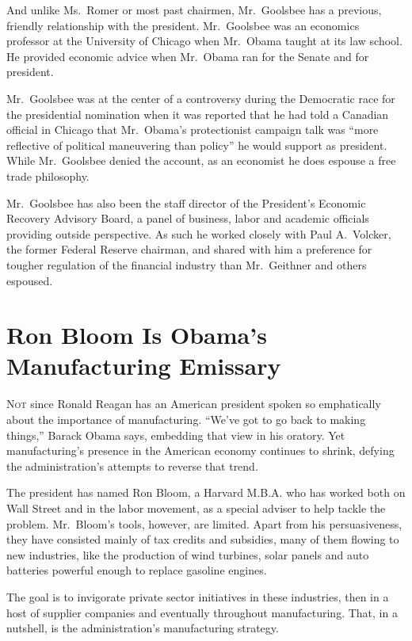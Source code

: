 ﻿\documentclass[12pt]{article}
\begin{document}
And unlike Ms.~Romer or most past chairmen, Mr.~Goolsbee has a previous, friendly relationship with
the president. Mr.~Goolsbee was an economics professor at the University of Chicago when Mr.~Obama
taught at its law school. He provided economic advice when Mr.~Obama ran for the Senate and for
president.

Mr.~Goolsbee was at the center of a controversy during the Democratic race for the presidential
nomination when it was reported that he had told a Canadian official in Chicago that Mr.~Obama's
protectionist campaign talk was ``more reflective of political maneuvering than policy'' he would
support as president. While Mr.~Goolsbee denied the account, as an economist he does espouse a free
trade philosophy.

Mr.~Goolsbee has also been the staff director of the President's Economic Recovery Advisory Board, a
panel of business, labor and academic officials providing outside perspective. As such he worked
closely with Paul A.~Volcker, the former Federal Reserve chairman, and shared with him a preference
for tougher regulation of the financial industry than Mr.~Geithner and others espoused.

\pagebreak
\section{Ron Bloom Is Obama's Manufacturing Emissary}

\lettrine{N}{ot} since Ronald Reagan has an American president spoken so
emphatically about the importance of manufacturing. ``We've got to go back to making things,''
Barack Obama says, embedding that view in his oratory. Yet manufacturing's presence in the American
economy continues to shrink, defying the administration's attempts to reverse that trend.

The president has named Ron Bloom, a Harvard M.B.A. who has worked both on Wall Street and in the
labor movement, as a special adviser to help tackle the problem. Mr.~Bloom's tools, however, are
limited. Apart from his persuasiveness, they have consisted mainly of tax credits and subsidies,
many of them flowing to new industries, like the production of wind turbines, solar panels and auto
batteries powerful enough to replace gasoline engines.

The goal is to invigorate private sector initiatives in these industries, then in a host of supplier
companies and eventually throughout manufacturing. That, in a nutshell, is the administration's
manufacturing strategy.
\end{document}
